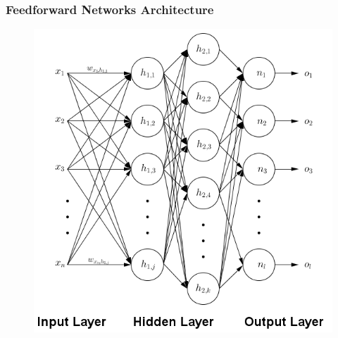 \documentclass{beamer}
\begin{document}
\begin{frame}
\frametitle{Feedforward Networks Architecture}

\begin{figure}[!htbp]
\centering
\includegraphics[width=\textwidth,height=0.85\textheight,keepaspectratio]{pictures/FeedForwardNeuralNetwork.png}
\label{fig:feedforward}
\end{figure}

\end{frame}


\end{document}
